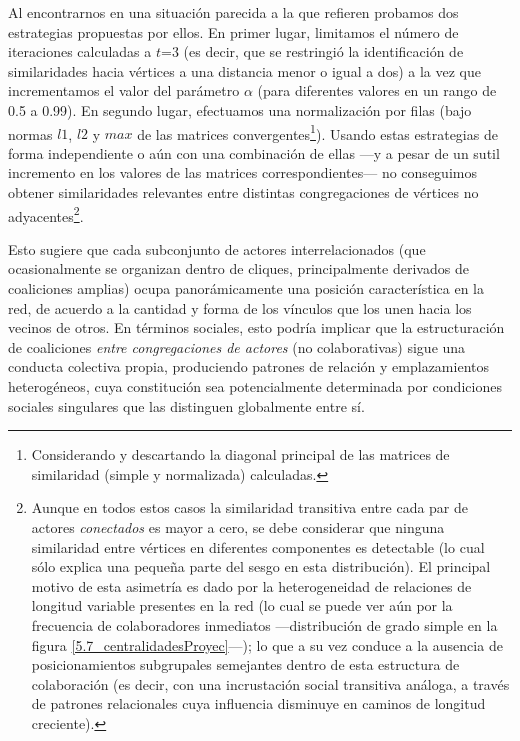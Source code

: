 \documentclass[letterpaper, 11pt]{book}
\theoremstyle{definition}
\theoremstyle{remark}
\begin{document}
Al encontrarnos en una situación parecida a la que refieren \citet{2018_Duricic_RegularEquivalence} probamos dos estrategias propuestas por ellos. 
En primer lugar, limitamos el número de iteraciones calculadas a $t$=3 (es decir, que se restringió la identificación de similaridades hacia vértices a una distancia menor o igual a dos) a la vez que incrementamos el valor del parámetro $\alpha$  (para diferentes valores en un rango de 0.5 a 0.99). 
En segundo lugar, efectuamos una normalización por filas (bajo normas $l1$, $l2$ y $max$ de las matrices convergentes\footnote{
    Considerando y descartando la diagonal principal de las matrices de similaridad (simple y normalizada) calculadas. 
}). 
Usando estas estrategias de forma independiente o aún con una combinación de ellas ---y a pesar de un sutil incremento en los valores de las matrices correspondientes--- no conseguimos obtener similaridades relevantes entre distintas congregaciones de vértices no adyacentes\footnote{
    Aunque en todos estos casos la similaridad transitiva entre cada par de actores \emph{conectados} es mayor a cero, se debe considerar que ninguna similaridad entre vértices en diferentes componentes es detectable (lo cual sólo explica una pequeña parte del sesgo en esta distribución). 
    El principal motivo de esta asimetría es dado por la heterogeneidad de relaciones de longitud variable presentes en la red (lo cual se puede ver aún por la frecuencia de colaboradores inmediatos ---distribución de grado simple en la figura \ref{5.7_centralidadesProyec}---); lo que a su vez conduce a la ausencia de posicionamientos subgrupales semejantes dentro de esta estructura de colaboración (es decir, con una incrustación social transitiva análoga, a través de patrones relacionales cuya influencia disminuye en caminos de longitud creciente).
}. 

Esto sugiere que cada subconjunto de actores interrelacionados (que ocasionalmente se organizan dentro de cliques, principalmente derivados de coaliciones amplias) ocupa panorámicamente una posición característica en la red, de acuerdo a la cantidad y forma de los vínculos que los unen hacia los vecinos de otros. 
En términos sociales, esto podría implicar que la estructuración de coaliciones \emph{entre congregaciones de actores} (no colaborativas) sigue una conducta colectiva propia, produciendo patrones de relación y emplazamientos heterogéneos, cuya constitución sea potencialmente determinada por condiciones sociales singulares que las distinguen globalmente entre sí. 
\end{document}
